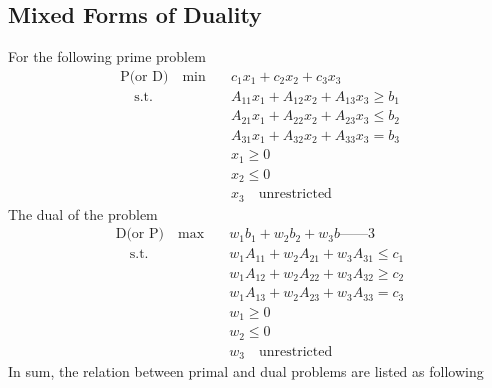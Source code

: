             \subsection{Mixed Forms of Duality}
                For the following prime problem
                \begin{align}
                    \text{P(or D)} \quad \min \quad & c_1x_1 + c_2x_2 + c_3x_3 \nonumber\\
                    \quad \text{s.t.} \quad & A_{11}x_1 + A_{12}x_2 + A_{13}x_3 \ge b_1 \nonumber\\
                                            & A_{21}x_1 + A_{22}x_2 + A_{23}x_3 \le b_2 \nonumber\\
                                            & A_{31}x_1 + A_{32}x_2 + A_{33}x_3 = b_3 \nonumber\\
                                            & x_1 \ge 0 \nonumber\\
                                            & x_2 \le 0 \nonumber\\
                                            & x_3 \quad \text{unrestricted} \nonumber
                \end{align}
                The dual of the problem
                \begin{align}
                    \text{D(or P)} \quad \max \quad & w_1b_1 + w_2b_2 + w_3b——3 \nonumber\\
                    \quad \text{s.t.} \quad & w_1A_{11} + w_2A_{21} + w_3A_{31} \le c_1 \nonumber\\
                                            & w_1A_{12} + w_2A_{22} + w_3A_{32} \ge c_2 \nonumber\\
                                            & w_1A_{13} + w_2A_{23} + w_3A_{33} = c_3 \nonumber\\
                                            & w_1 \ge 0 \nonumber\\
                                            & w_2 \le 0 \nonumber\\
                                            & w_3 \quad \text{unrestricted} \nonumber
                \end{align}
                In sum, the relation between primal and dual problems are listed as following\\
